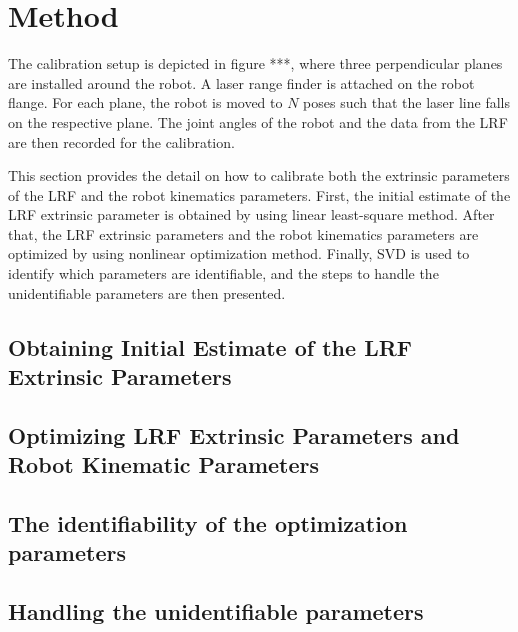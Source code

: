\section{Method}
\label{sec:method}

The calibration setup is depicted in figure ***, where three perpendicular planes are installed around the robot. A laser range finder is attached on the robot flange. For each plane, the robot is moved to $N$ poses such that the laser line falls on the respective plane. The joint angles of the robot and the data from the LRF are then recorded for the calibration. 

This section provides the detail on how to calibrate both the extrinsic parameters of the LRF and the robot kinematics parameters. First, the initial estimate of the LRF extrinsic parameter is obtained by using linear least-square method. After that, the LRF extrinsic parameters and the robot kinematics parameters are optimized by using nonlinear optimization method. 
Finally, SVD is used to identify which parameters are identifiable, and the steps to handle the unidentifiable parameters are then presented. 
\subsection{Obtaining Initial Estimate of the LRF Extrinsic Parameters}
\label{sec:first_step}









\subsection{Optimizing LRF Extrinsic Parameters and Robot Kinematic Parameters}
\label{sec:second_step}





\subsection{The identifiability of the optimization parameters}
\label{sec:third_step}




\subsection{Handling the unidentifiable parameters}
\label{sec:fourth_step}
